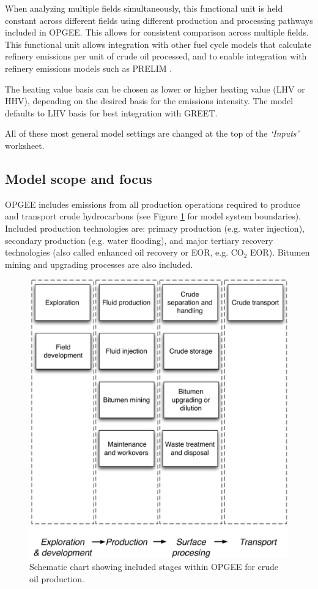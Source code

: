 \documentclass[11pt]{report}
\newcommand{\sheet}[1]{\textit{`{#1}'}}
\begin{document}
When analyzing multiple fields simultaneously, this functional unit is held constant across different fields using different production and processing pathways included in OPGEE. This allows for consistent comparison across multiple fields. This functional unit allows integration with other fuel cycle models that calculate refinery emissions per unit of crude oil processed, and to enable integration with refinery emissions models such as PRELIM \cite{Abella2012}. 

The heating value basis can be chosen as lower or higher heating value (LHV or HHV), depending on the desired basis for the emissions intensity. The model defaults to LHV basis for best integration with GREET.

All of these most general model settings are changed at the top of the \sheet{Inputs} worksheet.

\subsection{Model scope and focus}

OPGEE includes emissions from all production operations required to produce and transport crude hydrocarbons (see Figure \ref{fig:OPGEE_stages} for model system boundaries). Included production technologies are: primary production (e.g. water injection), secondary production (e.g. water flooding), and major tertiary recovery technologies (also called enhanced oil recovery or EOR, e.g. CO$_2$ EOR). Bitumen mining and upgrading processes are also included. 

\begin{figure}[t]
\includegraphics[width=0.85\columnwidth]{images/Flow_sheet_v4.pdf}
\caption{Schematic chart showing included stages within OPGEE for crude oil production.}
\label{fig:OPGEE_stages}
\end{figure}
\end{document}
